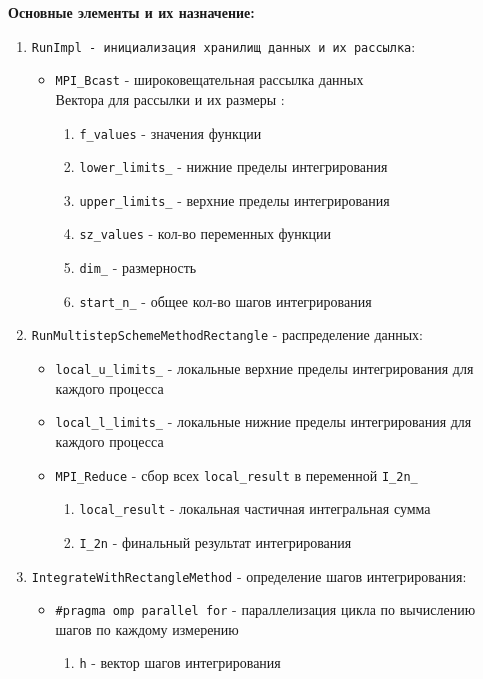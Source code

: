 \documentclass[14pt,a4paper]{article}
\begin{document}
\textbf{Основные элементы и их назначение:}
\begin{enumerate}
\item \texttt{RunImpl - инициализация хранилищ данных и их рассылка}:
  \begin{itemize}
  \item \texttt{MPI\_Bcast} - широковещательная рассылка данных \\
   Вектора для рассылки и их размеры :
  \begin{enumerate}
  \item \texttt{f\_values} - значения функции
  \item \texttt{lower\_limits\_} - нижние пределы интегрирования
  \item \texttt{upper\_limits\_} - верхние пределы интегрирования
  \item \texttt{sz\_values} - кол-во переменных функции
  \item \texttt{dim\_} - размерность
  \item \texttt{start\_n\_} - общее кол-во шагов интегрирования
  \end{enumerate}
  \end{itemize}

\item \texttt{RunMultistepSchemeMethodRectangle} - распределение данных:
  \begin{itemize}
  \item \texttt{local\_u\_limits\_} - локальные верхние пределы интегрирования для каждого процесса
  \item \texttt{local\_l\_limits\_} - локальные нижние пределы интегрирования для каждого процесса
  \item \texttt{MPI\_Reduce} - сбор всех \texttt{local\_result} в переменной \texttt{I\_2n\_}
  \begin{enumerate}
   \item \texttt{local\_result} - локальная частичная интегральная сумма
   \item \texttt{I\_2n} - финальный результат интегрирования
  \end{enumerate}
  \end{itemize}

\item \texttt{IntegrateWithRectangleMethod} - определение шагов интегрирования:
  \begin{itemize}
  \item \texttt{\#pragma omp parallel for} - параллелизация цикла по вычислению шагов по каждому измерению
  \begin{enumerate}
  \item \texttt{h} - вектор шагов интегрирования
  \end{enumerate}
  \end{itemize}


\end{enumerate}
\end{document}
